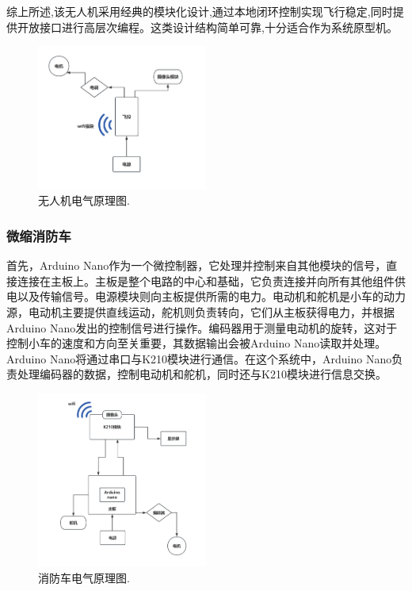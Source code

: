 \documentclass[12pt, a4paper, oneside]{article}
\begin{document}
综上所述,该无人机采用经典的模块化设计,通过本地闭环控制实现飞行稳定,同时提供开放接口进行高层次编程。这类设计结构简单可靠,十分适合作为系统原型机。

\begin{figure}[H]
    \centering
    \includegraphics[width=0.5\textwidth]{image-1.png}
    \caption{无人机电气原理图.}
    \label{无人机电气原理图}
\end{figure}


\subsubsection{微缩消防车}

首先，Arduino Nano作为一个微控制器，它处理并控制来自其他模块的信号，直接连接在主板上。主板是整个电路的中心和基础，它负责连接并向所有其他组件供电以及传输信号。电源模块则向主板提供所需的电力。电动机和舵机是小车的动力源，电动机主要提供直线运动，舵机则负责转向，它们从主板获得电力，并根据Arduino Nano发出的控制信号进行操作。编码器用于测量电动机的旋转，这对于控制小车的速度和方向至关重要，其数据输出会被Arduino Nano读取并处理。Arduino Nano将通过串口与K210模块进行通信。在这个系统中，Arduino Nano负责处理编码器的数据，控制电动机和舵机，同时还与K210模块进行信息交换。

\begin{figure}[H]
    \centering
    \includegraphics[width=0.5\textwidth]{image-3.png}
    \caption{消防车电气原理图.}
    \label{消防车电气原理图}
\end{figure}
\end{document}
